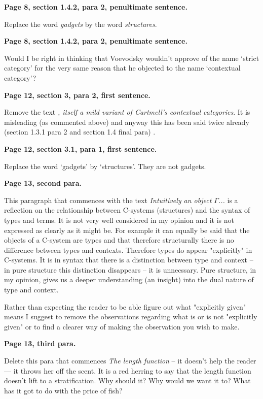 \documentclass[10pt,a4paper]{scrartcl}
\newenvironment{comment}[1]
{\begin{framed}
\textbf{#1}
}
{
\end{framed}
}
\begin{document}
\begin{comment}{Page 8, section 1.4.2, para 2, penultimate sentence.}
Replace the word \textit{gadgets}
by the word \textit{structures}.
\end{comment} 

\begin{comment}{Page 8, section 1.4.2, para 2, penultimate sentence.}
Would I be right in thinking that Voevodsky wouldn't approve of the name `strict category' for the very same reason that he objected to the name `contextual category'?
\end{comment} 

\begin{comment}{Page 12, section 3, para 2, first sentence.}
Remove the text \textit{, itself a mild variant of Cartmell's contextual categories}. It is misleading (as commented above) and anyway this has been said twice already  (section 1.3.1 para 2 and section 1.4 final para) . 
\end{comment} 

\begin{comment}{Page 12, section 3.1, para 1, first sentence.}
Replace the word `gadgets' by `structures'.
They are not gadgets. 
\end{comment} 

\begin{comment}{Page 13, second para.}
This paragraph that commences with the text \textit{Intuitively an object $\Gamma$...} is a reflection on the relationship between  C-systems (structures) and  the syntax of types and terms.  It is not very well considered in my opinion and it is not expressed as clearly as it might be. For example it can equally  be said that the objects of a C-system are types and that therefore structurally there is no difference between types and contexts. Therefore types do appear "explicitly" in C-systems. It is in syntax that there is a distinction between type and context -- in pure structure this distinction disappears -- it is unnecssary. Pure structure, in my opinion, gives us a deeper understanding (an insight) into the  dual nature of type and context.

Rather than expecting the reader to be able figure  out what "explicitly given" means  I suggest to remove the observations regarding what is or is not "explicitly given" or to find a clearer way of making the observation you wish to make.
\end{comment}

\begin{comment}{Page 13, third para.}
Delete this para that commences \textit{The length function} -- it doesn't help the reader --- it throws her off the scent. It is a red herring to  say that the length function doesn't lift to a stratification. Why should it? Why would we want it to? What has it got to do with the price of fish?
\end{comment} 
\end{document}
